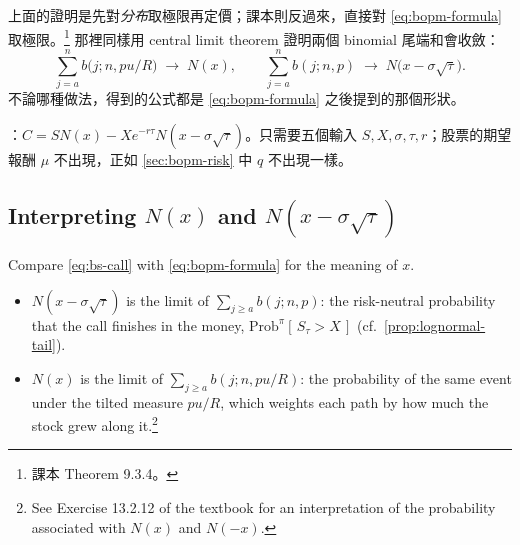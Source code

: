 \begin{note}
	上面的證明是先對\emph{分布}取極限再定價；課本則反過來，直接對 \eqref{eq:bopm-formula} 取極限。\footnote{課本 Theorem 9.3.4。}
	那裡同樣用 central limit theorem 證明兩個 binomial 尾端和會收斂：
	\[
		\sum_{j=a}^{n}b\bigl(j;n,pu/R\bigr)\;\to\;N(x) ,
		\qquad
		\sum_{j=a}^{n}b(j;n,p)\;\to\;N\bigl(x-\sigma\sqrt{\tau}\bigr) .
	\]
	不論哪種做法，得到的公式都是 \eqref{eq:bopm-formula} 之後提到的那個形狀。
\end{note}

\begin{remark}
	：$C=SN(x)-Xe^{-r\tau}N(x-\sigma\sqrt{\tau})$。只需要五個輸入 $S,X,\sigma,\tau,r$；股票的期望報酬 $\mu$ 不出現，正如 \autoref{sec:bopm-risk} 中 $q$ 不出現一樣。
\end{remark}
\suppend

\subsection{Interpreting \texorpdfstring{$N(x)$}{N(x)} and \texorpdfstring{$N(x-\sigma\sqrt{\tau})$}{N(x - sigma sqrt tau)}}
\label{sec:bs-interpret}


\suppstart
{}
\suppend

Compare \eqref{eq:bs-call} with \eqref{eq:bopm-formula} for the meaning of $x$.
\suppstart
\begin{itemize}[itemsep=0.3em]
	\item $N(x-\sigma\sqrt{\tau})$ is the limit of $\sum_{j\ge a}b(j;n,p)$: the risk-neutral probability that the call finishes in the money, $\mathrm{Prob}^{\pi}[\,S_{\tau}>X\,]$ (cf.\ \autoref{prop:lognormal-tail}).
	\item $N(x)$ is the limit of $\sum_{j\ge a}b(j;n,pu/R)$: the probability of the same event under the tilted measure $pu/R$, which weights each path by how much the stock grew along it.\footnote{See Exercise 13.2.12 of the textbook for an interpretation of the probability associated with $N(x)$ and $N(-x)$.}
\end{itemize}


